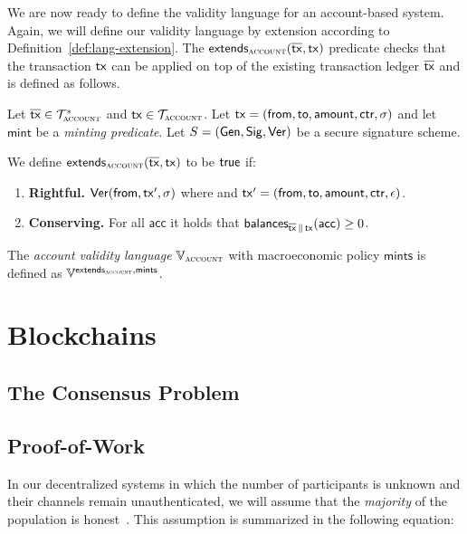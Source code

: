 We are now ready to define the validity language for an account-based system.
Again, we will
define our validity language by extension according to
Definition~\ref{def:lang-extension}.
The $\textsf{extends}_{\textsc{account}}(\overline{\mathsf{tx}}, \mathsf{tx})$ predicate checks that
the transaction $\mathsf{tx}$ can be applied on top of the existing transaction ledger
$\overline{\mathsf{tx}}$ and is defined as follows.

\begin{definition}
  Let $\overline{\mathsf{tx}} \in \mathcal{T}_\textsc{account}^*$ and $\mathsf{tx} \in \mathcal{T}_{\textsc{account}}$.
  Let $\mathsf{tx} = (\textsf{from}, \textsf{to}, \textsf{amount}, \textsf{ctr}, \sigma)$
  and let $\textsf{mint}$ be a \emph{minting predicate}.
  Let $S = (\mathsf{Gen}, \mathsf{Sig}, \mathsf{Ver})$ be a secure signature scheme.

  We define $\textsf{extends}_{\textsc{account}}(\overline{\mathsf{tx}}, \mathsf{tx})$ to be $\textsf{true}$
  if:

  \begin{enumerate}
    \item \textbf{Rightful.}
          $\mathsf{Ver}(\textsf{from}, \mathsf{tx}', \sigma)$ where
          and $\mathsf{tx}' = (\textsf{from}, \textsf{to}, \textsf{amount}, \textsf{ctr}, \epsilon)$.
    \item \textbf{Conserving.}
          For all $\textsf{acc}$ it holds that
          $\textsf{balances}_{\overline{\mathsf{tx}} \,\|\, \mathsf{tx}}(\textsf{acc}) \geq 0$.
  \end{enumerate}

  The \emph{account validity language} $\mathbb{V}_{\textsc{account}}$ with macroeconomic
  policy $\textsf{mints}$ is defined as
  $\mathbb{V}^{\textsf{extends}_{\textsc{account}},\textsf{mints}}$.
\end{definition}


\section{Blockchains}
\subsection{The Consensus Problem}
\subsection{Proof-of-Work}
\cite{pow}
In our decentralized systems in which the number of participants is unknown and
their channels remain unauthenticated, we will assume that the \emph{majority}
of the population is honest~\cite{backbone}. This assumption is summarized in
the following equation:

